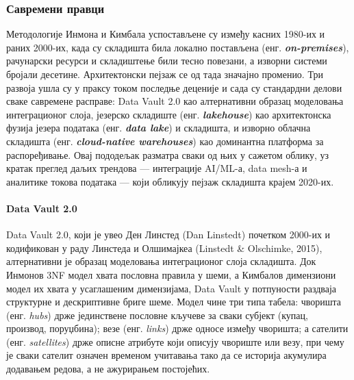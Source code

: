 \subsubsection{Савремени правци}
Методологије Инмона и Кимбала успостављене су између касних 1980-их и раних 2000-их, када су складишта била локално постављена (енг. \textbf{\textit{on-premises}}), рачунарски ресурси и складиштење били тесно повезани, а изворни системи бројали десетине. Архитектонски пејзаж се од тада значајно променио. Три развоја ушла су у праксу током последње деценије и сада су стандардни делови сваке савремене расправе: Data Vault 2.0 као алтернативни образац моделовања интеграционог слоја, језерско складиште (енг. \textbf{\textit{lakehouse}}) као архитектонска фузија језера података (енг. \textbf{\textit{data lake}}) и складишта, и изворно облачна складишта (енг. \textbf{\textit{cloud-native warehouses}}) као доминантна платформа за распоређивање. Овај пододељак разматра сваки од њих у сажетом облику, уз кратак преглед даљих трендова — интеграције AI/ML-а, data mesh-а и аналитике токова података — који обликују пејзаж складишта крајем 2020-их.

\paragraph{Data Vault 2.0}
Data Vault 2.0, који је увео Ден Линстед (Dan Linstedt) почетком 2000-их и кодификован у раду Линстеда и Олшимајкеа (Linstedt \& Olschimke, 2015), алтернативни је образац моделовања интеграционог слоја складишта. Док Инмонов 3NF модел хвата пословна правила у шеми, а Кимбалов димензиони модел их хвата у усаглашеним димензијама, Data Vault у потпуности раздваја структурне и дескриптивне бриге шеме. Модел чине три типа табела: чворишта (енг. \textit{hubs}) држе јединствене пословне кључеве за сваки субјект (купац, производ, поруџбина); везе (енг. \textit{links}) држе односе између чворишта; а сателити (енг. \textit{satellites}) држе описне атрибуте који описују чвориште или везу, при чему је сваки сателит означен временом учитавања тако да се историја акумулира додавањем редова, а не ажурирањем постојећих.


